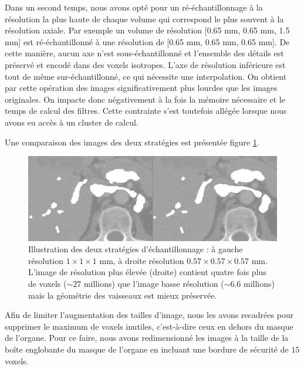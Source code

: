 Dans un second temps, nous avons opté pour un ré-échantillonnage à la résolution la plus haute de chaque volume qui correspond le plus souvent à la résolution axiale. Par exemple un volume de résolution [0.65 mm, 0.65 mm, 1.5 mm] est ré-échantillonné à une résolution de [0.65 mm, 0.65 mm, 0.65 mm]. De cette manière, aucun axe n'est sous-échantillonné et l'ensemble des détails est préservé et encodé dans des voxels isotropes. L'axe de résolution inférieure est tout de même sur-échantillonné, ce qui nécessite une interpolation. On obtient par cette opération des images significativement plus lourdes que les images originales. On impacte donc négativement à la fois la mémoire nécessaire et le temps de calcul des filtres. Cette contrainte s'est toutefois allégée lorsque nous avons eu accès à un cluster de calcul.

Une comparaison des images des deux stratégies est présentée figure \ref{fig:resolution_comparison}.

\begin{figure}[!ht]
  \centering
  \includegraphics[width=\textwidth]{Images/resolution_111_xxx.png}
  \caption{Illustration des deux stratégies d'échantillonnage : à gauche résolution $1\times1\times1$ mm, à droite résolution $0.57\times0.57\times0.57$ mm. L'image de résolution plus élevée (droite) contient quatre fois plus de voxels ($\sim 27$ millions) que l'image basse résolution ($\sim 6.6$ millions) mais la géométrie des vaisseaux est mieux préservée.}
  \label{fig:resolution_comparison}
\end{figure}

Afin de limiter l'augmentation des tailles d'image, nous les avons recadrées pour supprimer le maximum de voxels inutiles, c'est-à-dire ceux en dehors du masque de l'organe. Pour ce faire, nous avons redimensionné les images à la taille de la boîte englobante du masque de l'organe en incluant une bordure de sécurité de $15$ voxels. 

